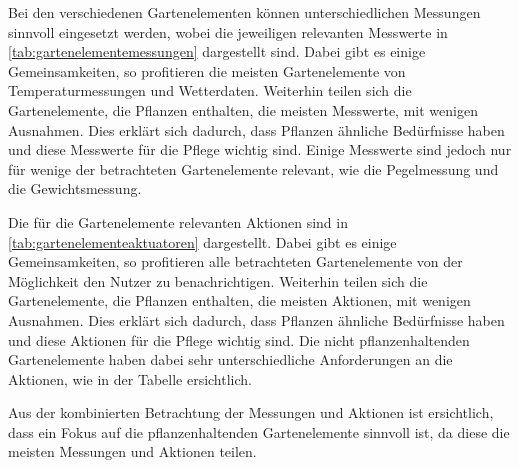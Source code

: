 Bei den verschiedenen Gartenelementen können unterschiedlichen Messungen sinnvoll eingesetzt werden, wobei die jeweiligen relevanten Messwerte in \cref{tab:gartenelementemessungen} dargestellt sind.
Dabei gibt es einige Gemeinsamkeiten, so profitieren die meisten Gartenelemente von Temperaturmessungen und Wetterdaten.
Weiterhin teilen sich die Gartenelemente, die Pflanzen enthalten, die meisten Messwerte, mit wenigen Ausnahmen.
Dies erklärt sich dadurch, dass Pflanzen ähnliche Bedürfnisse haben und diese Messwerte für die Pflege wichtig sind.
Einige Messwerte sind jedoch nur für wenige der betrachteten Gartenelemente relevant, wie die Pegelmessung und die Gewichtsmessung.

Die für die Gartenelemente relevanten Aktionen sind in \cref{tab:gartenelementeaktuatoren} dargestellt.
Dabei gibt es einige Gemeinsamkeiten, so profitieren alle betrachteten Gartenelemente von der Möglichkeit den Nutzer zu benachrichtigen.
Weiterhin teilen sich die Gartenelemente, die Pflanzen enthalten, die meisten Aktionen, mit wenigen Ausnahmen.
Dies erklärt sich dadurch, dass Pflanzen ähnliche Bedürfnisse haben und diese Aktionen für die Pflege wichtig sind.
Die nicht pflanzenhaltenden Gartenelemente haben dabei sehr unterschiedliche Anforderungen an die Aktionen, wie in der Tabelle ersichtlich.

Aus der kombinierten Betrachtung der Messungen und Aktionen ist ersichtlich, dass ein Fokus auf die pflanzenhaltenden Gartenelemente sinnvoll ist, da diese die meisten Messungen und Aktionen teilen.


